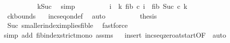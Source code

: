 \begin{isabellebody}
\ \ \ \ \ \ \ \ \isamarkupfalse%
\ k{\isacharunderscore}{\kern0pt}Suc\ \isamarkupfalse%
\ simp\isanewline
\ \ \ \ \ \ \isamarkupfalse%
\ \isamarkupfalse%
\ {\isachardoublequoteopen}{\isacharparenleft}{\kern0pt}{\isasymSum}i\ {\isacharequal}{\kern0pt}\ {}{\isachardot}{\kern0pt}{\isachardot}{\kern0pt}{\isacharparenleft}{\kern0pt}k{\isacharminus}{\kern0pt}{}{\isacharparenright}{\kern0pt}{\isachardot}{\kern0pt}\ fib\ {\isacharparenleft}{\kern0pt}c\ i{\isacharparenright}{\kern0pt}{\isacharparenright}{\kern0pt}\ {\isacharless}{\kern0pt}\ fib\ {\isacharparenleft}{\kern0pt}Suc\ {\isacharparenleft}{\kern0pt}c\ {\isacharparenleft}{\kern0pt}k{\isacharminus}{\kern0pt}{}{\isacharparenright}{\kern0pt}{\isacharparenright}{\kern0pt}{\isacharparenright}{\kern0pt}{\isachardoublequoteclose}\ \isanewline
\ \ \ \ \ \ \ \ \isamarkupfalse%
\ ck{\isacharunderscore}{\kern0pt}bounds{\isacharparenleft}{\kern0pt}{}{\isacharparenright}{\kern0pt}\ {}\ \isamarkupfalse%
\ inc{\isacharunderscore}{\kern0pt}seq{\isacharunderscore}{\kern0pt}on{\isacharunderscore}{\kern0pt}def\ \isamarkupfalse%
\ auto\isanewline
\ \ \ \ \ \ \isamarkupfalse%
\ \isamarkupfalse%
\ {\isacharquery}{\kern0pt}thesis\ \isanewline
\ \ \ \ \ \ \ \ \isamarkupfalse%
\ Suc\ smaller{\isacharunderscore}{\kern0pt}index{\isacharunderscore}{\kern0pt}implies{\isacharunderscore}{\kern0pt}fib{\isacharunderscore}{\kern0pt}le\ \isamarkupfalse%
\ fastforce\isanewline
\ \ \ \ \isamarkupfalse%
{\isacharparenleft}{\kern0pt}simp\ add{\isacharcolon}{\kern0pt}\ fib{\isacharunderscore}{\kern0pt}index{\isacharunderscore}{\kern0pt}strict{\isacharunderscore}{\kern0pt}mono\ assms{\isacharparenleft}{\kern0pt}{}{\isacharparenright}{\kern0pt}{\isacharparenright}{\kern0pt}\isanewline
\ \ \isamarkupfalse%
{\isacharparenleft}{\kern0pt}insert\ inc{\isacharunderscore}{\kern0pt}seq{\isacharunderscore}{\kern0pt}zero{\isacharunderscore}{\kern0pt}at{\isacharunderscore}{\kern0pt}start{\isacharbrackleft}{\kern0pt}OF\ {}{\isacharparenleft}{\kern0pt}{}{\isacharparenright}{\kern0pt}{\isacharbrackright}{\kern0pt}{\isacharcomma}{\kern0pt}\ auto{\isacharparenright}{\kern0pt}\isanewline
{}\isamarkupfalse%
%
\endisatagproof
{\isafoldproof}%
%
\isadelimproof
\isanewline
%
\endisadelimproof
\isanewline
{}\isamarkupfalse%

\end{isabellebody}
